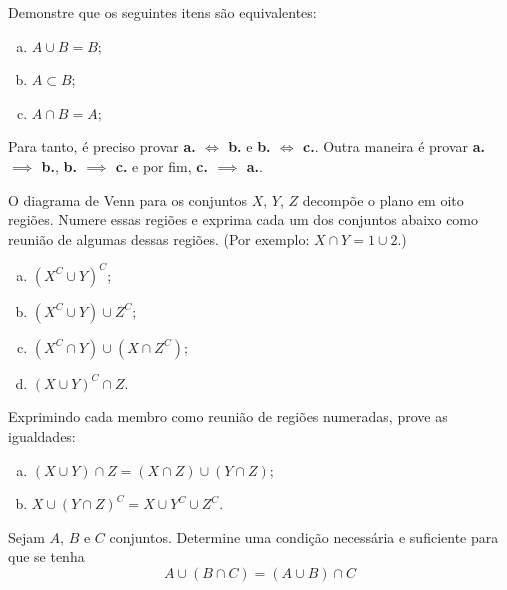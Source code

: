 \begin{exercise}
Demonstre que os seguintes itens são equivalentes:
	\begin{enumerate}[a.]
		\item $A \cup B = B$;
		\item $A \subset B$;
		\item $A \cap B = A$;
	\end{enumerate}
	\begin{tip}
		Para tanto, é preciso provar \textbf{a. $\iff$ b.} e \textbf{b. $\iff$ c.}.
		Outra maneira é provar \textbf{a. $\implies$ b.}, \textbf{b. $\implies$ c.} e por fim, \textbf{c. $\implies$ a.}.
	\end{tip}
\end{exercise}

\begin{exercise}
O diagrama de Venn para os conjuntos $X$, $Y$, $Z$ decompõe o
plano em oito regiões. Numere essas regiões e exprima cada um dos
conjuntos abaixo como reunião de algumas dessas regiões. (Por
exemplo: $X \cap Y = 1 \cup 2$.)
\begin{enumerate}[a.]
  \item $\left(X^C \cup Y \right)^C$;
  \item $\left(X^C \cup Y \right) \cup Z^C$;
  \item $\left(X^C \cap Y \right) \cup \left(X \cap Z^C \right)$;
  \item $\left(X \cup Y \right)^C \cap Z$.
\end{enumerate}
\end{exercise}

\begin{exercise}
Exprimindo cada membro como reunião de regiões numeradas, prove
as igualdades:
\begin{enumerate}[a.]
  \item $\left(X \cup Y \right)\cap Z = \left(X \cap Z \right) \cup \left(Y \cap Z
  \right)$;
  \item $X \cup \left(Y \cap Z \right)^C = X \cup Y^C \cup Z^C$.
\end{enumerate}
\end{exercise}

\begin{exercise}
Sejam $A$, $B$ e $C$ conjuntos. Determine uma condição necessária e
suficiente para que se tenha 
	$$A \cup \left( B \cap C \right) = \left(A \cup B \right) \cap C$$
\end{exercise}

